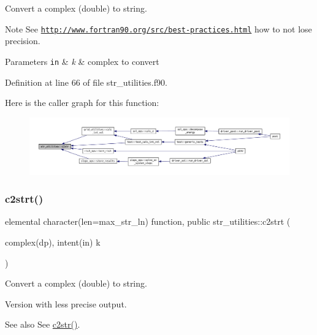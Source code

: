 Convert a complex (double) to string. 

\begin{DoxyNote}{Note}
See \href{http://www.fortran90.org/src/best-practices.html}{\tt http\+://www.\+fortran90.\+org/src/best-\/practices.\+html} how to not lose precision.
\end{DoxyNote}

\begin{DoxyParams}[1]{Parameters}
\mbox{\tt in}  & {\em k} & complex to convert \\
\hline
\end{DoxyParams}


Definition at line 66 of file str\+\_\+utilities.\+f90.

Here is the caller graph for this function\+:\nopagebreak
\begin{figure}[H]
\begin{center}
\leavevmode
\includegraphics[width=350pt]{namespacestr__utilities_a308e943e5e244e3e0f852f2ecb3e3183_icgraph}
\end{center}
\end{figure}
\mbox{\label{namespacestr__utilities_abca28d6272d447dc1c0c100624c6ed75}} 
\subsubsection{\texorpdfstring{c2strt()}{c2strt()}}
{\footnotesize\ttfamily elemental character(len=max\+\_\+str\+\_\+ln) function, public str\+\_\+utilities\+::c2strt (\begin{DoxyParamCaption}\item[{complex(dp), intent(in)}]{k }\end{DoxyParamCaption})}



Convert a complex (double) to string. 

Version with less precise output.

\begin{DoxySeeAlso}{See also}
See \hyperlink{namespacestr__utilities_a308e943e5e244e3e0f852f2ecb3e3183}{c2str()}.
\end{DoxySeeAlso}

